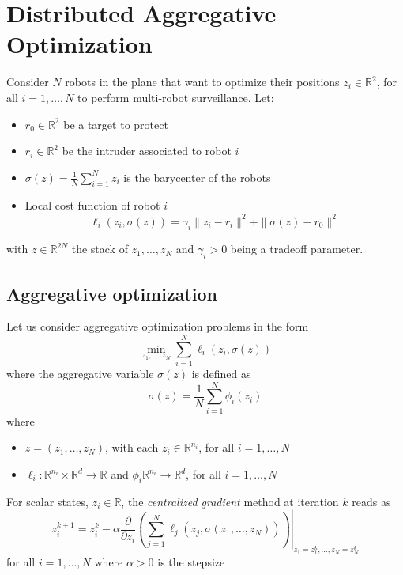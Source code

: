 \documentclass{book}
\newcommand{\R}{\mathbb{R}}
\theoremstyle{theoremv2}
\theoremstyle{defv2}
\theoremstyle{remark}
\theoremstyle{remark}
\theoremstyle{definition}
\theoremstyle{definition}
\begin{document}
\chapter{Distributed Aggregative Optimization}
Consider $N$ robots in the plane that want to optimize their positions $z_i\in\R^2$, for all $i=1,\dots,N$ to perform multi-robot surveillance. Let:
\begin{itemize}
    \item $r_0\in\R^2$ be a target to protect 
    \item $r_i\in\R^2$ be the intruder associated to robot $i$ 
    \item $\sigma(z) = \displaystyle\frac{1}{N}\displaystyle\sum_{i=1}^{N}z_i$ is the barycenter of the robots 
    \item Local cost function of robot $i$ 
        \[
            \ell_i(z_i,\sigma(z)) = \gamma_i\|z_i-r_i\|^2 + \|\sigma(z)-r_0\|^2
        \]
\end{itemize}
with $z\in\R^{2N}$ the stack of $z_1,\dots,z_N$ and $\gamma_i>0$ being a tradeoff parameter.
\section{Aggregative optimization}
Let us consider aggregative optimization problems in the form 
\[
    \min_{z_1,\dots,z_N} \displaystyle\sum_{i=1}^{N} \ell_i(z_i,\sigma(z))
\]
where the aggregative variable $\sigma(z)$ is defined as 
\[
    \sigma(z) = \displaystyle\frac{1}{N}\displaystyle\sum_{i=1}^{N} \phi_i(z_i)
\]
where 
\begin{itemize}
    \item $z=(z_1,\dots,z_N)$, with each $z_i\in\R^{n_i}$, for all $i=1,\dots,N$
    \item $\ell_i:\R^{n_i}\times\R^d\to\R$ and $\phi_i\R^{n_i}\to\R^d$, for all $i=1,\dots,N$
\end{itemize}
For scalar states, $z_i\in\R$, the \emph{centralized gradient} method at iteration $k$ reads as 
\[
    z_i^{k+1} = z_i^k -\alpha \displaystyle\frac{\partial}{\partial z_i}\left. \left(\displaystyle\sum_{j=1}^{N}\ell_j(z_j,\sigma(z_1,\dots,z_N))\right)\right|_{z_1 = z_1^k,\dots,z_N = z_N^k}
\]
for all $i=1,\dots,N$ where $\alpha>0$ is the stepsize
\end{document}
